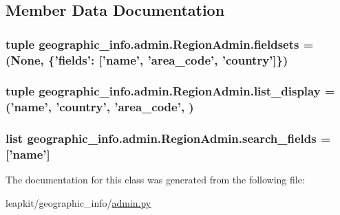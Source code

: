\subsection{Member Data Documentation}
\hypertarget{classgeographic__info_1_1admin_1_1_region_admin_ad60e4aec8409f4aaa41f6219d7ea7c60}{
\subsubsection[{fieldsets}]{\setlength{\rightskip}{0pt plus 5cm}tuple geographic\-\_\-info.\-admin.\-Region\-Admin.\-fieldsets = (None, \{'fields'\-: \mbox{[}'name', 'area\-\_\-code', 'country'\mbox{]}\})\hspace{0.3cm}{\ttfamily [static]}}}\label{classgeographic__info_1_1admin_1_1_region_admin_ad60e4aec8409f4aaa41f6219d7ea7c60}
\hypertarget{classgeographic__info_1_1admin_1_1_region_admin_a4a7f66500a9d73a6632fc584b1a07467}{
\subsubsection[{list\-\_\-display}]{\setlength{\rightskip}{0pt plus 5cm}tuple geographic\-\_\-info.\-admin.\-Region\-Admin.\-list\-\_\-display = ('name', 'country', 'area\-\_\-code', )\hspace{0.3cm}{\ttfamily [static]}}}\label{classgeographic__info_1_1admin_1_1_region_admin_a4a7f66500a9d73a6632fc584b1a07467}
\hypertarget{classgeographic__info_1_1admin_1_1_region_admin_aa6267eb8eefb5d29336e4664cb45f455}{
\subsubsection[{search\-\_\-fields}]{\setlength{\rightskip}{0pt plus 5cm}list geographic\-\_\-info.\-admin.\-Region\-Admin.\-search\-\_\-fields = \mbox{[}'name'\mbox{]}\hspace{0.3cm}{\ttfamily [static]}}}\label{classgeographic__info_1_1admin_1_1_region_admin_aa6267eb8eefb5d29336e4664cb45f455}


The documentation for this class was generated from the following file\-:\begin{DoxyCompactItemize}
\item 
leapkit/geographic\-\_\-info/\hyperlink{geographic__info_2admin_8py}{admin.\-py}\end{DoxyCompactItemize}
